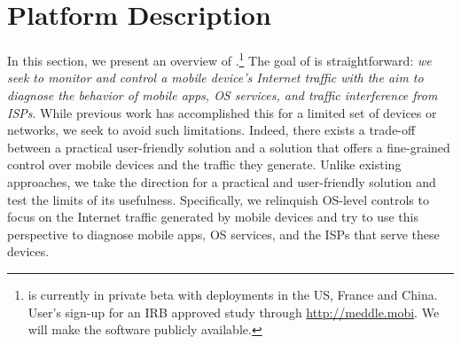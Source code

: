 \section{Platform Description}

In this section, we present an overview of \meddle.\footnote{\meddle is currently in private beta with deployments in the US, France and China. User's sign-up for an IRB approved study through \url{http://meddle.mobi}. We will make the \meddle software publicly available.} 
The goal of \meddle is straightforward: \emph{we seek to monitor and control a mobile device's Internet traffic with the aim to diagnose the behavior of mobile apps, OS services, and traffic interference from ISPs}. 
While previous work has accomplished this for a limited set of devices or networks, we seek to avoid such limitations. 
Indeed, there exists a trade-off between a practical user-friendly solution and a solution that offers a fine-grained control over mobile devices and the traffic they generate.
Unlike existing approaches, we take the direction for a practical and user-friendly solution and test the limits of its usefulness.
Specifically, we relinquish OS-level controls to focus on the Internet traffic generated by mobile devices and try to use this perspective to diagnose mobile apps, OS services, and the ISPs that serve these devices.

